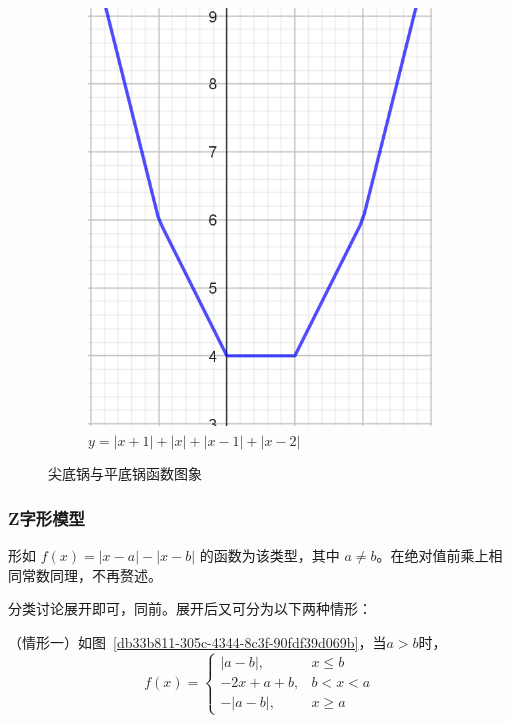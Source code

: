 \documentclass[a4paper,openany]{ctexbook}
\begin{document}
\begin{figure}
\begin{subfigure}{0.45\textwidth}
        \includegraphics[width=\textwidth]{image16.png}
        \caption{\(y=|x+1|+|x|+|x-1|+|x-2|\)}
    \end{subfigure}
    \caption{尖底锅与平底锅函数图象}\label{268282bf-8b1e-44db-853c-353758d4d5a7}
\end{figure}

\subsubsection{Z字形模型}

形如 \(f(x)=|x-a|-|x-b|\) 的函数为该类型，其中 \(a\ne b\)。在绝对值前乘上相同常数同理，不再赘述。

分类讨论展开即可，同前。展开后又可分为以下两种情形：

（情形一）如图~\ref{db33b811-305c-4344-8c3f-90fdf39d069b}，当\(a>b\)时，
\[f(x)=
    \begin{cases}
        |a-b|,   & x \le b \\
        -2x+a+b, & b<x<a   \\
        -|a-b|,  & x \ge a
    \end{cases}
\]
\end{document}
